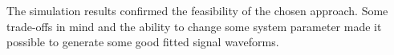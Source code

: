 

The simulation results confirmed the feasibility of the chosen approach.
Some trade-offs in mind and the ability to change some system parameter made it possible to generate some good fitted signal waveforms.

